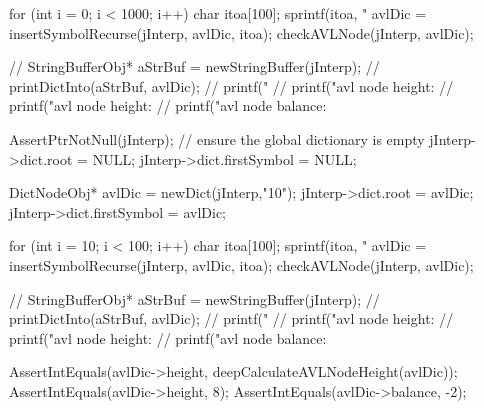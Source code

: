   for (int i = 0; i < 1000; i++) {
    char itoa[100];
    sprintf(itoa, "%
    avlDic = insertSymbolRecurse(jInterp, avlDic, itoa);
  }
  checkAVLNode(jInterp, avlDic);

//  StringBufferObj* aStrBuf = newStringBuffer(jInterp);
//  printDictInto(aStrBuf, avlDic);
//  printf("%
//  printf("avl node height: %
//  printf("avl node height: %
//  printf("avl node balance: %
\stopCTest
\stopTestCase

\startCTest
  AssertPtrNotNull(jInterp);
  // ensure the global dictionary is empty
  jInterp->dict.root        = NULL;
  jInterp->dict.firstSymbol = NULL;

  DictNodeObj* avlDic = newDict(jInterp,"10");
  jInterp->dict.root        = avlDic;
  jInterp->dict.firstSymbol = avlDic;

  for (int i = 10; i < 100; i++) {
    char itoa[100];
    sprintf(itoa, "%
    avlDic = insertSymbolRecurse(jInterp, avlDic, itoa);
  }
  checkAVLNode(jInterp, avlDic);

//  StringBufferObj* aStrBuf = newStringBuffer(jInterp);
//  printDictInto(aStrBuf, avlDic);
//  printf("%
//  printf("avl node height: %
//  printf("avl node height: %
//  printf("avl node balance: %

  AssertIntEquals(avlDic->height, deepCalculateAVLNodeHeight(avlDic));
  AssertIntEquals(avlDic->height, 8);
  AssertIntEquals(avlDic->balance, -2);
\stopCTest
\stopTestCase
\stopTestSuite